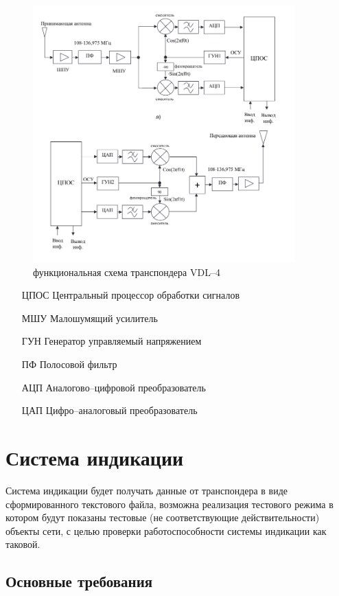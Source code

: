 \documentclass[a4paper,12pt]{report} %
\begin{document}
\begin{figure}[!ht]
  \includegraphics[width=0.9\textwidth]{vdl4}
  \caption{функциональная схема транспондера VDL--4}
\end{figure}

\begin{itemize}
\item [ЦПОС] Центральный процессор обработки сигналов
\item [МШУ] Малошумящий усилитель
\item [ГУН] Генератор управляемый напряжением
\item [ПФ] Полосовой фильтр
\item [АЦП] Аналогово--цифровой преобразователь
\item [ЦАП] Цифро--аналоговый преобразователь
\end{itemize}
\newpage

\section{Система индикации}

Система индикации будет получать данные от транспондера в виде сформированного
текстового файла, возможна реализация тестового режима в котором будут показаны
тестовые (не соответствующие действительности) объекты сети, с целью проверки
работоспособности системы индикации как таковой.

\subsection{Основные требования}
\end{document}
